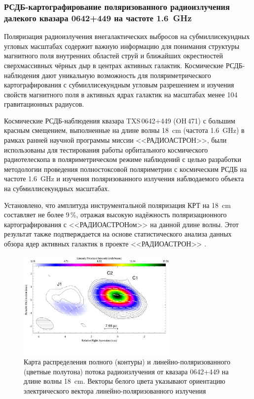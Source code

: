 \subsubsection{РСДБ-картографирование поляризованного радиоизлучения далекого квазара 0642+449 на
частоте \SI{1.6}{\GHz}}

Поляризация радиоизлучения внегалактических выбросов на субмиллисекундных угловых масштабах содержит
важную информацию для понимания структуры магнитного поля внутренних областей струй и ближайших
окрестностей сверхмассивных чёрных дыр в центрах активных галактик. Космические РСДБ-наблюдения дают
уникальную возможность для поляриметрического картографирования с субмиллисекундным угловым
разрешением и изучения свойств магнитного поля в активных ядрах галактик на масштабах менее 104
гравитационных радиусов.

Космические РСДБ-наблюдения квазара TXS\,0642+449 (OH\,471) с большим красным смещением, выполненные
на длине волны \SI{18}{\cm} (частота \SI{1.6}{\GHz}) в рамках ранней научной программы миссии
<<РАДИОАСТРОН>>, были использованы для тестирования работы орбитального космического радиотелескопа
в поляриметрическом режиме наблюдений с целью разработки методологии проведения полностоксовой
поляриметрии с космическим РСДБ на частоте \SI{1.6}{\GHz} и изучения поляризованного излучения
наблюдаемого объекта на субмиллисекундных масштабах.

Установлено, что амплитуда инструментальной поляризация КРТ на \SI{18}{\cm} составляет не более
9\,\%, отражая высокую надёжность поляризационного картографирования с <<РАДИОАСТРОНом>> на данной
длине волны. Этот результат \cite{Lobanov_2015} также подтверждается на основе статистического
анализа данных обзора ядер активных галактик в проекте <<РАДИОАСТРОН>> \cite{Pashchenko_2015}.

\begin{figure}[tbh]
\centering
\includegraphics[width=0.7\textwidth]{vNPO2016_0642.jpg}

\caption{Карта распределения полного (контуры) и линейно-поляризованного (цветные полутона) потока
радиоизлучения от квазара 0642+449 на длине волны \SI{18}{\cm}. Векторы белого цвета указывают
ориентацию электрического вектора линейно-поляризованного излучения }
\label{fig:vnpo2016_0642}
\end{figure}

